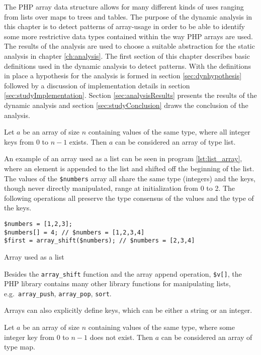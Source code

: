 The PHP array data structure allows for many different kinds of uses ranging from lists over maps to trees and tables. The purpose of the dynamic analysis in this chapter is to detect patterns of array-usage in order to be able to identify some more restrictive data types contained within the way PHP arrays are used. The results of the analysis are used to choose a suitable abstraction for the static analysis in chapter \ref{ch:analysis}. The first section of this chapter describes basic definitions used in the dynamic analysis to detect patterns. With the definitions in place a hypothesis for the analysis is formed in section \ref{sec:dynhypothesis} followed by a discussion of implementation details in section \ref{sec:studyImplementation}. Section \ref{sec:analysisResults} presents the results of the dynamic analysis and section \ref{sec:studyConclusion} draws the conclusion of the analysis.

\begin{definition}
\label{def:list}
Let $a$ be an array of size $n$ containing values of the same type, where all integer keys from 0 to $n-1$ exists. Then $a$ can be considered an array of type list.
\end{definition}

An example of an array used as a list can be seen in program \ref{lst:list_array}, where an element is appended to the list and shifted off the beginning of the list. The values of the \texttt{\$numbers} array all share the same type (integers) and the keys, though never directly manipulated, range at initialization from 0 to 2. The following operations all preserve the type consensus of the values and the type of the keys. 

\begin{program}[ht]
\begin{lstlisting}
$numbers = [1,2,3];
$numbers[] = 4; // $numbers = [1,2,3,4]
$first = array_shift($numbers); // $numbers = [2,3,4]
\end{lstlisting}
\caption{Array used as a list}
\label{lst:list_array}
\end{program}

Besides the \texttt{array\_shift} function and the array append operation, \texttt{\$v[]}, the PHP library contains many other library functions for manipulating lists, e.g.\ \texttt{array\_push}, \texttt{array\_pop}, \texttt{sort}.

Arrays can also explicitly define keys, which can be either a string or an integer. 

\begin{definition}
\label{def:map}
Let $a$ be an array of size $n$ containing values of the same type, where some integer key from 0 to $n-1$ does not exist. Then $a$ can be considered an array of type map.
\end{definition}

